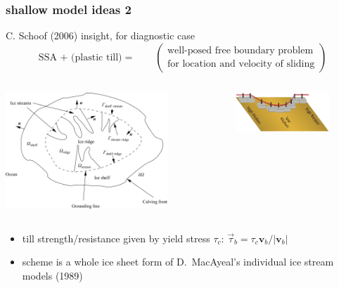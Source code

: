 \documentclass{beamer}
\begin{document}
\begin{frame}
  \frametitle{shallow model ideas 2}

\vspace{-0.2in}
\begin{block}{C. Schoof (2006) insight, for diagnostic case}
$$\text{SSA + (plastic till)} = \qquad \begin{pmatrix}
\text{well-posed free boundary problem} \\ \text{for location and velocity of sliding}
\end{pmatrix} $$
\end{block}

\begin{columns}
\begin{column}{0.5\textwidth}
\begin{center}
  \includegraphics[width=0.75\textwidth]{schoof_planform}
\end{center}
\end{column}
\begin{column}{0.5\textwidth}
\begin{center}
  \includegraphics[width=0.75\textwidth]{schoof_sliders}
\end{center}
\end{column}
\end{columns}

\scriptsize
\begin{itemize}
\item till strength/resistance given by yield stress $\tau_c$:  \qquad $\vec\tau_b = \tau_c \mathbf{v}_b / |\mathbf{v}_b|$
\item scheme is a whole ice sheet form of D.~MacAyeal's individual ice stream models (1989)
\end{itemize}
\end{frame}
\end{document}
